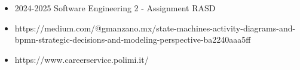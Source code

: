 \begin{itemize}
    \item 2024-2025 Software Engineering 2 - Assignment RASD
    \item https://medium.com/@gmanzano.mx/state-machines-activity-diagrams-and-bpmn-strategic-decisions-and-modeling-perspective-ba2240aaa5ff
    \item https://www.careerservice.polimi.it/
\end{itemize}
